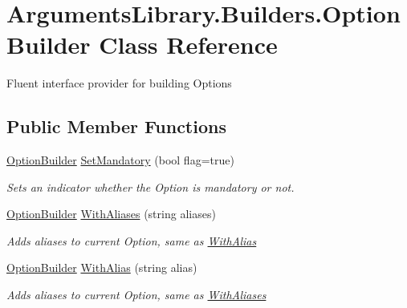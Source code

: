 \hypertarget{class_arguments_library_1_1_builders_1_1_option_builder}{\section{Arguments\+Library.\+Builders.\+Option\+Builder Class Reference}
\label{class_arguments_library_1_1_builders_1_1_option_builder}
}


Fluent interface provider for building Options  


\subsection*{Public Member Functions}
\begin{DoxyCompactItemize}
\item 
\hyperlink{class_arguments_library_1_1_builders_1_1_option_builder}{Option\+Builder} \hyperlink{class_arguments_library_1_1_builders_1_1_option_builder_a08da2ea4bd719448640417e4f7f70032}{Set\+Mandatory} (bool flag=true)
\begin{DoxyCompactList}\small\item\em Sets an indicator whether the Option is mandatory or not. \end{DoxyCompactList}\item 
\hyperlink{class_arguments_library_1_1_builders_1_1_option_builder}{Option\+Builder} \hyperlink{class_arguments_library_1_1_builders_1_1_option_builder_a4e67ec2746aa2f841a2da941664c2120}{With\+Aliases} (string aliases)
\begin{DoxyCompactList}\small\item\em Adds aliases to current Option, same as \hyperlink{class_arguments_library_1_1_builders_1_1_option_builder_ac04774a8724bcdfaacce9fd47d23322b}{With\+Alias} \end{DoxyCompactList}\item 
\hyperlink{class_arguments_library_1_1_builders_1_1_option_builder}{Option\+Builder} \hyperlink{class_arguments_library_1_1_builders_1_1_option_builder_ac04774a8724bcdfaacce9fd47d23322b}{With\+Alias} (string alias)
\begin{DoxyCompactList}\small\item\em Adds aliases to current Option, same as \hyperlink{class_arguments_library_1_1_builders_1_1_option_builder_a4e67ec2746aa2f841a2da941664c2120}{With\+Aliases} \end{DoxyCompactList}\item 

\end{DoxyCompactItemize}
